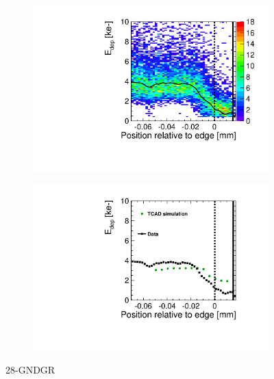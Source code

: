 \begin{figure}[htbp]
  \centering
  \begin{subfigure}[b]{0.5\linewidth}
    \includegraphics[width=\textwidth]{figures/ActiveEdge/TCAD_data_Edep_28_GNDGR.pdf}
    \caption{}
  \end{subfigure}\hfill
  \begin{subfigure}[b]{0.5\linewidth}
    \includegraphics[width=\textwidth]{figures/ActiveEdge/TCAD_data_28_GNDGR.pdf}
    \caption{}
  \end{subfigure}
  \caption{28-GNDGR}
  \label{fig:TCAD_vs_data_28_GNDGR}
\end{figure}


